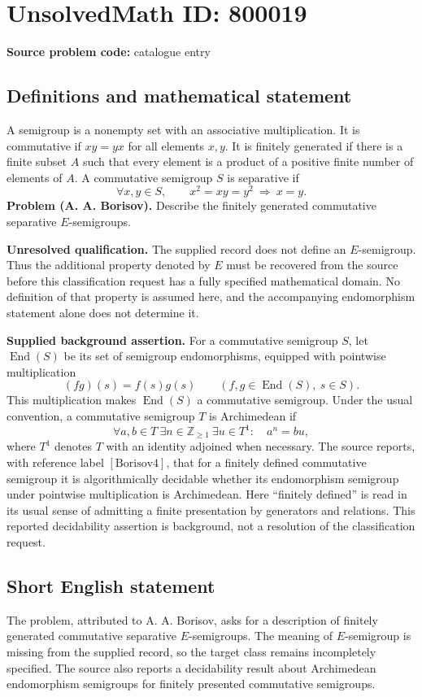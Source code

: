 \documentclass[11pt]{article}
\newcommand{\Z}{\mathbb{Z}}
\begin{document}
\section*{UnsolvedMath ID: 800019}
\textbf{Source problem code:} catalogue entry
\subsection{Definitions and mathematical statement}
A semigroup is a nonempty set with an associative multiplication. It is commutative if \(xy=yx\) for all elements \(x,y\). It is finitely generated if there is a finite subset \(A\) such that every element is a product of a positive finite number of elements of \(A\). A commutative semigroup \(S\) is separative if
\[
\forall x,y\in S,\qquad x^2=xy=y^2\ \Longrightarrow\ x=y.
\]
\textbf{Problem (A. A. Borisov).} Describe the finitely generated commutative separative \(E\)-semigroups.

\textbf{Unresolved qualification.} The supplied record does not define an \(E\)-semigroup. Thus the additional property denoted by \(E\) must be recovered from the source before this classification request has a fully specified mathematical domain. No definition of that property is assumed here, and the accompanying endomorphism statement alone does not determine it.

\textbf{Supplied background assertion.} For a commutative semigroup \(S\), let \(\operatorname{End}(S)\) be its set of semigroup endomorphisms, equipped with pointwise multiplication
\[
(fg)(s)=f(s)g(s)\qquad(f,g\in\operatorname{End}(S),\ s\in S).
\]
This multiplication makes \(\operatorname{End}(S)\) a commutative semigroup. Under the usual convention, a commutative semigroup \(T\) is Archimedean if
\[
\forall a,b\in T\ \exists n\in\Z_{\geq 1}\ \exists u\in T^1:\quad a^n=bu,
\]
where \(T^1\) denotes \(T\) with an identity adjoined when necessary. The source reports, with reference label \([\mathrm{Borisov4}]\), that for a finitely defined commutative semigroup it is algorithmically decidable whether its endomorphism semigroup under pointwise multiplication is Archimedean. Here ``finitely defined'' is read in its usual sense of admitting a finite presentation by generators and relations. This reported decidability assertion is background, not a resolution of the classification request.
\subsection{Short English statement}
The problem, attributed to A. A. Borisov, asks for a description of finitely generated commutative separative \(E\)-semigroups. The meaning of \(E\)-semigroup is missing from the supplied record, so the target class remains incompletely specified. The source also reports a decidability result about Archimedean endomorphism semigroups for finitely presented commutative semigroups.
\end{document}
